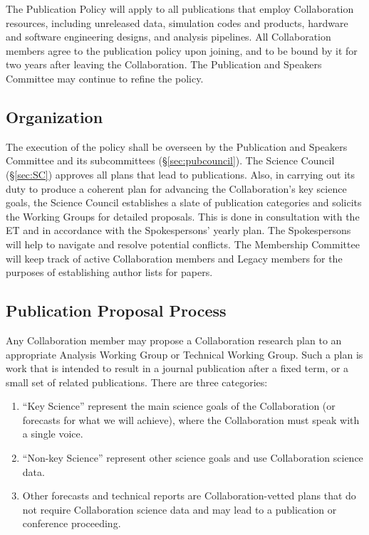 \documentclass[12pt]{article}
\begin{document}
The Publication Policy will apply to all publications that employ Collaboration resources, including unreleased data, simulation codes and products, hardware and software engineering designs, and analysis pipelines. All Collaboration members agree to the publication policy upon joining, and to be bound by it for two years after leaving the Collaboration. The Publication and Speakers Committee may continue to refine the policy.
\subsection{Organization}

The execution of the policy shall be overseen by the Publication and Speakers Committee and its subcommittees (\S\ref{sec:pubcouncil}). The Science Council (\S\ref{sec:SC}) approves all plans that lead to publications. Also, in carrying out its duty to produce a coherent plan for advancing the Collaboration's key science goals, the Science Council establishes a slate of publication categories and solicits the Working Groups for detailed proposals. This is done in consultation with the ET and in accordance with the Spokespersons' yearly plan. The Spokespersons will help to navigate and resolve potential conflicts. The Membership Committee will keep track of active Collaboration members and Legacy members for the purposes of establishing author lists for papers.

\subsection{Publication Proposal Process}
\label{sec:pubprop}

Any Collaboration member may propose a Collaboration research plan to an appropriate Analysis Working Group or Technical Working Group.  Such a plan is work that is intended to result in a journal publication after a fixed term, or a small set of related publications.  There are three categories:
\begin{enumerate}

\item ``Key Science'' represent the main science goals of the Collaboration (or forecasts for what we will achieve), where the Collaboration must speak with a single voice.  

\item ``Non-key Science'' represent other science goals and use Collaboration science data.  

\item Other forecasts and technical reports are Collaboration-vetted plans that do not require Collaboration science data and may lead to a publication or conference proceeding.  

\end{enumerate}
\end{document}
